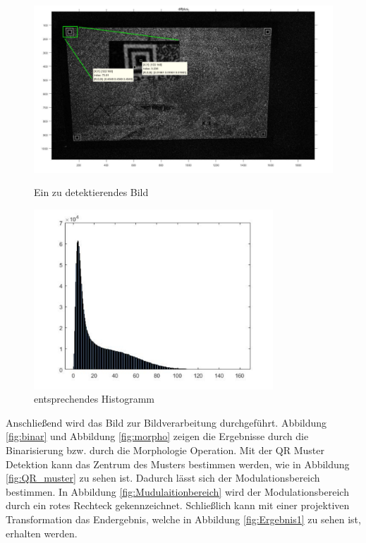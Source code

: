 \begin{figure}[H]
\centering 
\begin{minipage}[b]{0.49\textwidth} 
\centering 
\includegraphics[width=1.0\textwidth]{images/5_Implementirung/nachdiff.pdf} 
\caption{Ein zu detektierendes Bild}
\label{fig:nachdiff}
\end{minipage}
\begin{minipage}[b]{0.49\textwidth} 
\centering 
\includegraphics[width=0.8\textwidth]{images/5_Implementirung/histodiff.pdf}
\caption{entsprechendes Histogramm}
\label{fig:Histogramm}
\end{minipage}
\end{figure}

Anschließend wird das Bild zur Bildverarbeitung durchgeführt. Abbildung \ref{fig:binar} und Abbildung \ref{fig:morpho} zeigen die Ergebnisse durch die Binarisierung bzw. durch die Morphologie Operation. Mit der QR Muster Detektion kann das Zentrum des Musters bestimmen werden, wie in Abbildung \ref{fig:QR_muster} zu sehen ist. Dadurch lässt sich der Modulationsbereich bestimmen. In Abbildung \ref{fig:Mudulaitionbereich} wird der Modulationsbereich durch ein rotes Rechteck gekennzeichnet. Schließlich kann mit einer projektiven Transformation das Endergebnis, welche in Abbildung \ref{fig:Ergebnis1} zu sehen ist, erhalten werden.


